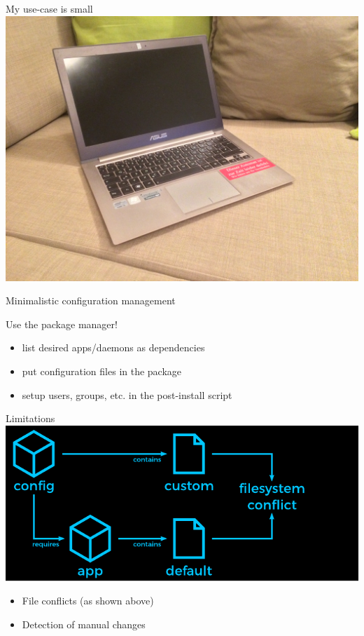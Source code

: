 \documentclass{beamer}
\begin{document}
\begin{frame}[plain,t]{My use-case is small}
 \centering
 \includegraphics[height=0.8\textheight]{notebook.jpg}
\end{frame}

\begin{frame}[plain,c]
 \centering
 \LARGE Minimalistic configuration management
\end{frame}

\begin{frame}[plain,c]{Use the package manager!}
 \begin{itemize}
  \item list desired apps/daemons as dependencies
  \item put configuration files in the package
  \item setup users, groups, etc. in the post-install script
 \end{itemize}
\end{frame}

\begin{frame}[plain,t]{Limitations}
 \centering
 \includegraphics[width=\linewidth]{diagram-files2.pdf}
 \vspace{0em}
 \begin{itemize}
  \item File conflicts (as shown above)
  \item Detection of manual changes
 \end{itemize}
\end{frame}
\end{document}
